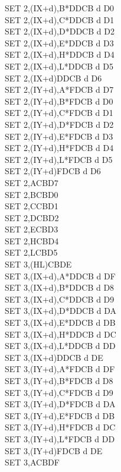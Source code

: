 \documentclass[oneside,a4paper]{book}
\begin{document}
\begin{multicols}{3}
{\begin{tabbing}
SET 2,(IX+d),B*\>DDCB d D0\\
SET 2,(IX+d),C*\>DDCB d D1\\
SET 2,(IX+d),D*\>DDCB d D2\\
SET 2,(IX+d),E*\>DDCB d D3\\
SET 2,(IX+d),H*\>DDCB d D4\\
SET 2,(IX+d),L*\>DDCB d D5\\
SET 2,(IX+d)\>DDCB d D6\\
SET 2,(IY+d),A*\>FDCB d D7\\
SET 2,(IY+d),B*\>FDCB d D0\\
SET 2,(IY+d),C*\>FDCB d D1\\
SET 2,(IY+d),D*\>FDCB d D2\\
SET 2,(IY+d),E*\>FDCB d D3\\
SET 2,(IY+d),H*\>FDCB d D4\\
SET 2,(IY+d),L*\>FDCB d D5\\
SET 2,(IY+d)\>FDCB d D6\\
SET 2,A\>CBD7\\
SET 2,B\>CBD0\\
SET 2,C\>CBD1\\
SET 2,D\>CBD2\\
SET 2,E\>CBD3\\
SET 2,H\>CBD4\\
SET 2,L\>CBD5\\
SET 3,(HL)\>CBDE\\
SET 3,(IX+d),A*\>DDCB d DF\\
SET 3,(IX+d),B*\>DDCB d D8\\
SET 3,(IX+d),C*\>DDCB d D9\\
SET 3,(IX+d),D*\>DDCB d DA\\
SET 3,(IX+d),E*\>DDCB d DB\\
SET 3,(IX+d),H*\>DDCB d DC\\
SET 3,(IX+d),L*\>DDCB d DD\\
SET 3,(IX+d)\>DDCB d DE\\
SET 3,(IY+d),A*\>FDCB d DF\\
SET 3,(IY+d),B*\>FDCB d D8\\
SET 3,(IY+d),C*\>FDCB d D9\\
SET 3,(IY+d),D*\>FDCB d DA\\
SET 3,(IY+d),E*\>FDCB d DB\\
SET 3,(IY+d),H*\>FDCB d DC\\
SET 3,(IY+d),L*\>FDCB d DD\\
SET 3,(IY+d)\>FDCB d DE\\
SET 3,A\>CBDF\\

\end{tabbing}}
\end{multicols}
\end{document}
